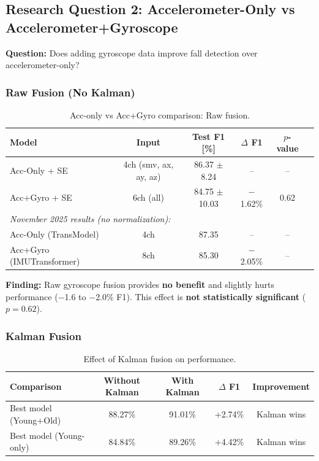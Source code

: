 \documentclass{article}
\begin{document}
\subsection{Research Question 2: Accelerometer-Only vs Accelerometer+Gyroscope}

\textbf{Question:} Does adding gyroscope data improve fall detection over accelerometer-only?

\subsubsection{Raw Fusion (No Kalman)}

\begin{table}[htbp]
    \centering
    \caption{Acc-only vs Acc+Gyro comparison: Raw fusion.}
    \label{tab:rq2_raw}
    \begin{tabular}{lccccc}
        \toprule
        \textbf{Model} & \textbf{Input} & \textbf{Test F1 [\%]} & \textbf{$\Delta$ F1} & \textbf{$p$-value} \\
        \midrule
        Acc-Only + SE & 4ch (smv, ax, ay, az) & 86.37 $\pm$ 8.24 & -- & -- \\
        Acc+Gyro + SE & 6ch (all) & 84.75 $\pm$ 10.03 & $-$1.62\% & 0.62 \\
        \midrule
        \multicolumn{5}{l}{\textit{November 2025 results (no normalization):}} \\
        Acc-Only (TransModel) & 4ch & 87.35 & -- & -- \\
        Acc+Gyro (IMUTransformer) & 8ch & 85.30 & $-$2.05\% & -- \\
        \bottomrule
    \end{tabular}
\end{table}

\textbf{Finding:} Raw gyroscope fusion provides \textbf{no benefit} and slightly hurts performance ($-$1.6 to $-$2.0\% F1). This effect is \textbf{not statistically significant} ($p = 0.62$).

\subsubsection{Kalman Fusion}

\begin{table}[htbp]
    \centering
    \caption{Effect of Kalman fusion on performance.}
    \label{tab:rq2_kalman}
    \begin{tabular}{lcccc}
        \toprule
        \textbf{Comparison} & \textbf{Without Kalman} & \textbf{With Kalman} & \textbf{$\Delta$ F1} & \textbf{Improvement} \\
        \midrule
        Best model (Young+Old) & 88.27\% & 91.01\% & +2.74\% & Kalman wins \\
        Best model (Young-only) & 84.84\% & 89.26\% & +4.42\% & Kalman wins \\
        \bottomrule
    \end{tabular}
\end{table}
\end{document}

